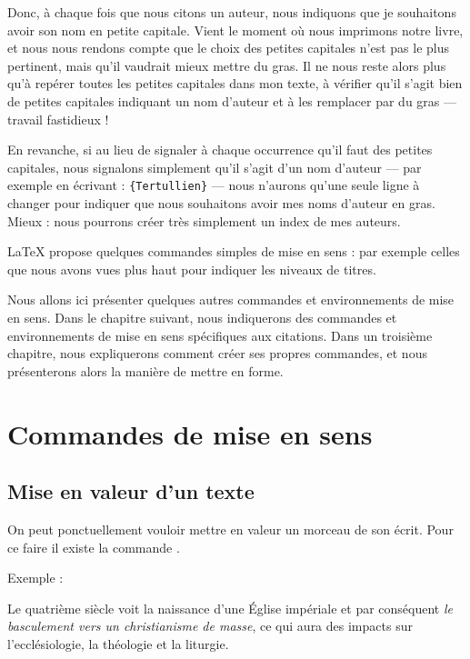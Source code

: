 Donc, à chaque fois que nous citons un auteur, nous indiquons que je souhaitons avoir son nom en petite capitale.
Vient le moment où nous imprimons notre livre, et nous nous rendons compte que le choix des petites capitales n'est pas le plus pertinent, mais qu'il vaudrait mieux mettre du gras. Il ne nous reste alors plus qu'à repérer toutes les petites capitales dans mon texte, à vérifier qu'il s'agit bien de petites capitales indiquant un nom d'auteur et à les remplacer par du gras --- travail fastidieux !

En revanche, si au lieu de signaler à chaque occurrence qu'il faut des petites capitales, nous signalons simplement  qu'il s'agit d'un nom d'auteur --- par exemple en écrivant : \verb|{Tertullien}| --- nous n'aurons qu'une seule ligne à changer pour indiquer que nous souhaitons avoir mes noms d'auteur en gras. Mieux : nous pourrons créer très simplement un index de mes auteurs.

LaTeX propose quelques commandes simples de mise en sens  : par exemple celles que nous avons vues plus haut pour indiquer les niveaux de titres.

Nous allons ici présenter quelques autres commandes et environnements de mise en sens. Dans le chapitre suivant, nous indiquerons des commandes et environnements de mise en sens spécifiques aux citations. Dans un troisième chapitre, nous expliquerons comment créer ses propres commandes, et nous présenterons alors la manière de mettre en forme.

\section{Commandes de mise en sens}

\subsection{Mise en valeur d'un texte}

On peut ponctuellement vouloir mettre en valeur un morceau de son écrit. Pour ce faire il existe la commande .

Exemple :

\begin{latexcode}
Le quatrième siècle voit la naissance d'une Église impériale
et par conséquent \emph{le basculement vers un christianisme
de masse},
ce qui aura des impacts sur l'ecclésiologie,
la théologie et la liturgie.
\end{latexcode}

